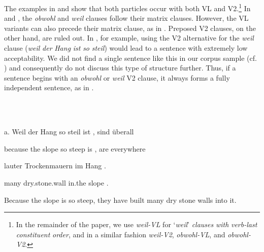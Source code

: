 \begin{styleMoutonTextBetweenExamples}
The examples in  and  show that both particles occur with both VL and V2.\footnote{In the remainder of the paper, we use \textit{weil-VL} for ‘\textit{weil}’ \textit{clauses} \textit{with} \textit{verb-last} \textit{constituent} \textit{order}, and in a similar fashion \textit{weil-V2}, \textit{obwohl-VL}, and \textit{obwohl-V2}.} In  and , the \textit{obwohl} and \textit{weil} clauses follow their matrix clauses. However, the VL variants can also precede their matrix clause, as in . Preposed V2 clauses, on the other hand, are ruled out. In , for example, using the V2 alternative for the \textit{weil} clause (\textit{weil} \textit{der} \textit{Hang} \textit{ist} \textit{so} \textit{steil}) would lead to a sentence with extremely low acceptability. We did not find a single sentence like this in our corpus sample (cf. ) and consequently do not discuss this type of structure further. Thus, if a sentence begins with an \textit{obwohl} or \textit{weil} V2 clause, it always forms a fully independent sentence, as in .
\end{styleMoutonTextBetweenExamples}

\begin{styleMoutonExample}
\ea%
    \label{ex:key:3}
    \gll\\
        \\
    \glt
    \z

          a.  Weil    der  Hang  so  steil  ist  ,  sind  überall
\end{styleMoutonExample}

\begin{styleMoutonExampleAlphaGloss}
because  the  slope  so  steep  is  ,  are  everywhere
\end{styleMoutonExampleAlphaGloss}

\begin{styleMoutonExampleAlphaGloss}
lauter    Trockenmauern  im  Hang  .
\end{styleMoutonExampleAlphaGloss}

\begin{styleMoutonExampleAlphaGloss}
many    dry.stone.wall  in.the  slope  .
\end{styleMoutonExampleAlphaGloss}

\begin{styleMoutonExamplesTransAlpha}
Because the slope is so steep, they have built many dry stone walls into it.
\end{styleMoutonExamplesTransAlpha}

